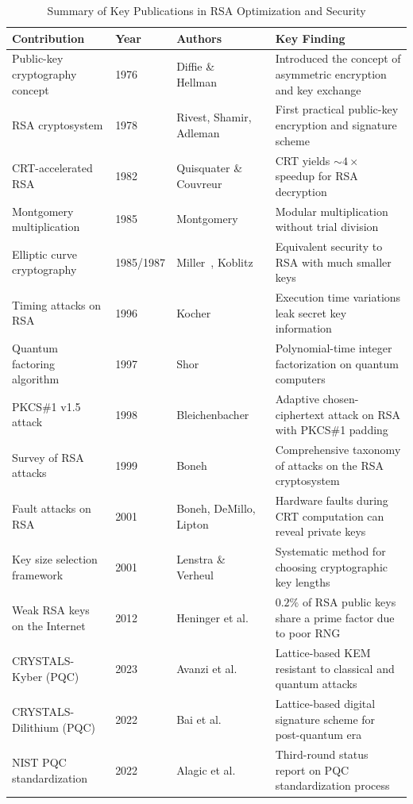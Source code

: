 \documentclass[journal]{IEEEtran}
\begin{document}
\begin{table}[!t]
\caption{Summary of Key Publications in RSA Optimization and Security}
\label{tab:papers_compare}
\centering
\small
\begin{tabular}{|p{3.5cm}|p{1.5cm}|p{3cm}|p{4.5cm}|}
\hline
\textbf{Contribution} & \textbf{Year} & \textbf{Authors} & \textbf{Key Finding} \\
\hline
Public-key cryptography concept & 1976 & Diffie \& Hellman~\cite{diffie1976} & Introduced the concept of asymmetric encryption and key exchange \\
\hline
RSA cryptosystem & 1978 & Rivest, Shamir, Adleman~\cite{rivest1978} & First practical public-key encryption and signature scheme \\
\hline
CRT-accelerated RSA & 1982 & Quisquater \& Couvreur~\cite{quisquater1982} & CRT yields $\sim$$4\times$ speedup for RSA decryption \\
\hline
Montgomery multiplication & 1985 & Montgomery~\cite{montgomery1985} & Modular multiplication without trial division \\
\hline
Elliptic curve cryptography & 1985/1987 & Miller~\cite{miller1985}, Koblitz~\cite{koblitz1987} & Equivalent security to RSA with much smaller keys \\
\hline
Timing attacks on RSA & 1996 & Kocher~\cite{kocher1996} & Execution time variations leak secret key information \\
\hline
Quantum factoring algorithm & 1997 & Shor~\cite{shor1997} & Polynomial-time integer factorization on quantum computers \\
\hline
PKCS\#1 v1.5 attack & 1998 & Bleichenbacher~\cite{bleichenbacher1998} & Adaptive chosen-ciphertext attack on RSA with PKCS\#1 padding \\
\hline
Survey of RSA attacks & 1999 & Boneh~\cite{boneh1999} & Comprehensive taxonomy of attacks on the RSA cryptosystem \\
\hline
Fault attacks on RSA & 2001 & Boneh, DeMillo, Lipton~\cite{boneh2001} & Hardware faults during CRT computation can reveal private keys \\
\hline
Key size selection framework & 2001 & Lenstra \& Verheul~\cite{lenstra2001} & Systematic method for choosing cryptographic key lengths \\
\hline
Weak RSA keys on the Internet & 2012 & Heninger et al.~\cite{heninger2012} & $0.2\%$ of RSA public keys share a prime factor due to poor RNG \\
\hline
CRYSTALS-Kyber (PQC) & 2023 & Avanzi et al.~\cite{kyber2023} & Lattice-based KEM resistant to classical and quantum attacks \\
\hline
CRYSTALS-Dilithium (PQC) & 2022 & Bai et al.~\cite{dilithium2022} & Lattice-based digital signature scheme for post-quantum era \\
\hline
NIST PQC standardization & 2022 & Alagic et al.~\cite{alagic2022} & Third-round status report on PQC standardization process \\
\hline
\end{tabular}
\end{table}
\end{document}
